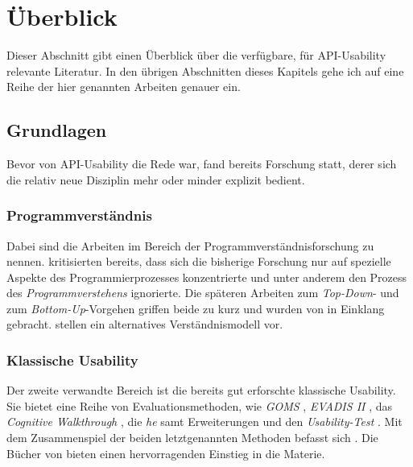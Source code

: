 \section{Überblick}
\label{sec:Historie}

Dieser Abschnitt gibt einen Überblick über die verfügbare, für API-Usability relevante Literatur. In den übrigen Abschnitten dieses Kapitels gehe ich auf eine Reihe der hier genannten Arbeiten genauer ein.

\subsection{Grundlagen}

Bevor von API-Usability die Rede war, fand bereits Forschung statt, derer sich die relativ neue Disziplin mehr oder minder explizit bedient.

\subsubsection{Programmverständnis}

Dabei sind die Arbeiten im Bereich der Programmverständnisforschung zu nennen. \cite{BenShneiderman:gn} kritisierten bereits, dass sich die bisherige Forschung nur auf spezielle Aspekte des Programmierprozesses konzentrierte und unter anderem den Prozess des \textit{Programmverstehens} ignorierte. Die späteren Arbeiten zum \textit{Top-Down}- \citep{Brooks:1983fj} und zum \textit{Bottom-Up}-Vorgehen \citep{Pennington:1987dc} griffen beide zu kurz und wurden von \cite{Shaft:1998tc} in Einklang gebracht. \cite{LaToza:2007fj} stellen ein alternatives Verständnismodell vor.

\subsubsection{Klassische Usability}

Der zweite verwandte Bereich ist die bereits gut erforschte klassische Usability. Sie bietet eine Reihe von Evaluationsmethoden, wie \textit{GOMS} \citep{Card:1983:PHI:578027}, \textit{EVADIS II} \citep{Oppermann1992Evalu-26396}, das \textit{Cognitive Walkthrough} \citep{Wharton:1994to}, die \textit{\gls{he}} \citep{Nielsen:1990bw} samt Erweiterungen \citep[u.a.][]{Sarodnick:2006vc} und den \textit{Usability-Test} \citep{Faulkner:2003wn}. Mit dem Zusammenspiel der beiden letztgenannten Methoden befasst sich \cite{Fu:2002tp}. Die Bücher von \cite{Sarodnick:2006vc,Nielsen:2005uv} bieten einen hervorragenden Einstieg in die Materie.

